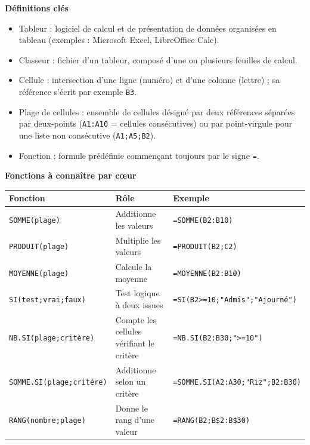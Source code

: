 \documentclass[11pt]{article}
\newcommand{\cle}[1]{{\popxbold\color{popdark}#1}}
\begin{document}
\begin{bilan}
\textbf{Définitions clés}
\begin{itemize}
  \item \cle{Tableur} : logiciel de calcul et de présentation de données organisées en tableau (exemples : Microsoft \cle{Excel}, LibreOffice \cle{Calc}).
  \item \cle{Classeur} : fichier d'un tableur, composé d'une ou plusieurs \cle{feuilles de calcul}.
  \item \cle{Cellule} : intersection d'une ligne (numéro) et d'une colonne (lettre) ; sa \cle{référence} s'écrit par exemple \texttt{B3}.
  \item \cle{Plage de cellules} : ensemble de cellules désigné par deux références séparées par deux-points (\texttt{A1:A10} = cellules consécutives) ou par point-virgule pour une liste non consécutive (\texttt{A1;A5;B2}).
  \item \cle{Fonction} : formule prédéfinie commençant toujours par le signe \texttt{=}.
\end{itemize}

\textbf{Fonctions à connaître par c\oe ur}
\begin{center}
\begin{tabularx}{\linewidth}{|l|X|l|}
\hline
\rowcolor{popblueL} \textbf{Fonction} & \textbf{Rôle} & \textbf{Exemple} \\
\hline
\texttt{SOMME(plage)} & Additionne les valeurs & \texttt{=SOMME(B2:B10)} \\
\hline
\texttt{PRODUIT(plage)} & Multiplie les valeurs & \texttt{=PRODUIT(B2;C2)} \\
\hline
\texttt{MOYENNE(plage)} & Calcule la moyenne & \texttt{=MOYENNE(B2:B10)} \\
\hline
\texttt{SI(test;vrai;faux)} & Test logique à deux issues & \texttt{=SI(B2>=10;"Admis";"Ajourné")} \\
\hline
\texttt{NB.SI(plage;critère)} & Compte les cellules vérifiant le critère & \texttt{=NB.SI(B2:B30;">=10")} \\
\hline
\texttt{SOMME.SI(plage;critère)} & Additionne selon un critère & \texttt{=SOMME.SI(A2:A30;"Riz";B2:B30)} \\
\hline
\texttt{RANG(nombre;plage)} & Donne le rang d'une valeur & \texttt{=RANG(B2;B\$2:B\$30)} \\
\hline
\end{tabularx}
\end{center}


\end{bilan}
\end{document}
